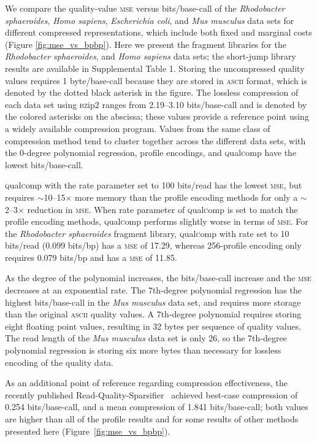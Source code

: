 \documentclass{bioinfo}
\begin{document}
We compare the quality-value \textsc{mse} versus bits/base-call of the
\textit{Rhodobacter sphaeroides}, \textit{Homo sapiens},
\textit{Escherichia coli}, and \textit{Mus musculus} data sets for
different compressed representations, which include both fixed and
marginal costs (Figure \ref{fig:mse_vs_bpbp}). Here we present the
fragment libraries for the \textit{Rhodobacter sphaeroides}, and
\textit{Homo sapiens} data sets; the short-jump library results are
available in Supplemental Table 1. Storing the uncompressed quality
values requires 1 byte/base-call because they are stored in
\textsc{ascii} format, which is denoted by the dotted black asterisk
in the figure. The lossless compression of each data set using
\textsc{bz}ip2 ranges from 2.19--3.10 bits/base-call and is denoted by
the colored asterisks on the abscissa; these values provide a
reference point using a widely available compression program. Values
from the same class of compression method tend to cluster together
across the different data sets, with the 0-degree polynomial
regression, profile encodings, and \textsc{q}ual\textsc{c}omp have the
lowest bits/base-call.

\textsc{q}ual\textsc{c}omp with the rate parameter set to 100
bits/read has the lowest \textsc{mse}, but requires
$\sim$10--15$\times$ more memory than the profile encoding methods for
only a $\sim$2--3$\times$ reduction in \textsc{mse}. When rate
parameter of \textsc{q}ual\textsc{c}omp is set to match the profile
encoding methods, \textsc{q}ual\textsc{c}omp performs slightly worse
in terms of \textsc{mse}. For the \textit{Rhodobacter sphaeroides}
fragment library, \textsc{q}ual\textsc{c}omp with rate set to 10
bits/read (0.099 bits/bp) has a \textsc{mse} of 17.29, whereas
256-profile encoding only requires 0.079 bits/bp and has a
\textsc{mse} of 11.85.

As the degree of the polynomial increases, the bits/base-call increase
and the \textsc{mse} decreases at an exponential rate. The 7th-degree
polynomial regression has the highest bits/base-call in the
\textit{Mus musculus} data set, and requires more storage than the
original \textsc{ascii} quality values. A 7th-degree polynomial
requires storing eight floating point values, resulting in 32 bytes
per sequence of quality values. The read length of the \textit{Mus
  musculus} data set is only 26, so the 7th-degree polynomial
regression is storing six more bytes than necessary for lossless
encoding of the quality data.

As an additional point of reference regarding compression
effectiveness, the recently published
Read-Quality-Sparsifier~\citep{DBLP:conf/recomb/YuYB14} achieved
best-case compression of 0.254 bits/base-call, and a mean compression
of 1.841 bits/base-call; both values are higher than all of the
profile results and for some results of other methods presented here
(Figure~\ref{fig:mse_vs_bpbp}).
\end{document}

